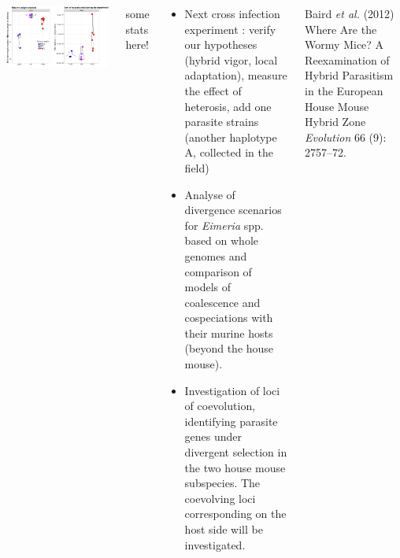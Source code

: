 \documentclass[30pt, a0paper, portrait, margin=0mm, innermargin=15mm,
               blockverticalspace=15mm, colspace=15mm, subcolspace=8mm]{tikzposter}
\begin{document}
\begin{columns}
{  \begin{center}
  \includegraphics[scale=1.1]{May2017_E64.pdf}

  \end{center}
  
  some stats here!
}

{
  \begin{center}
  \begin{itemize}
        \item Next cross infection experiment : verify our hypotheses (hybrid vigor, local adaptation), measure the effect of heterosis, add one parasite strains (another haplotype A, collected in the field)
        \item Analyse of divergence scenarios for \textit{Eimeria} spp. based on whole genomes and comparison of models of coalescence and cospeciations with their murine hosts (beyond the house mouse).
        \item Investigation of loci of coevolution, identifying parasite genes under divergent selection in the two house mouse subspecies. The coevolving loci corresponding on the host side will be investigated.
  \end{itemize}

  \end{center}
}


      {
        \begin{small}
          
          \hangindent=2cm Baird \textit{et al.} (2012) Where Are the Wormy Mice? A Reexamination of Hybrid Parasitism in the European House Mouse Hybrid Zone
           \textit{Evolution} 66 (9): 2757--72.


\end{small}}
\end{columns}
\end{document}
